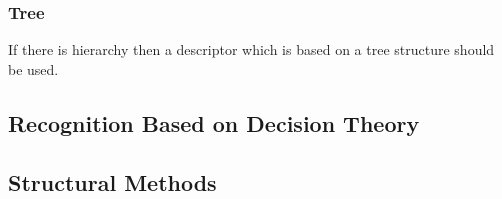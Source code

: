 \subsubsection{Tree}
If there is hierarchy then a descriptor which is based on a tree structure
should be used.


\subsection{Recognition Based on Decision Theory}

\subsection{Structural Methods}

